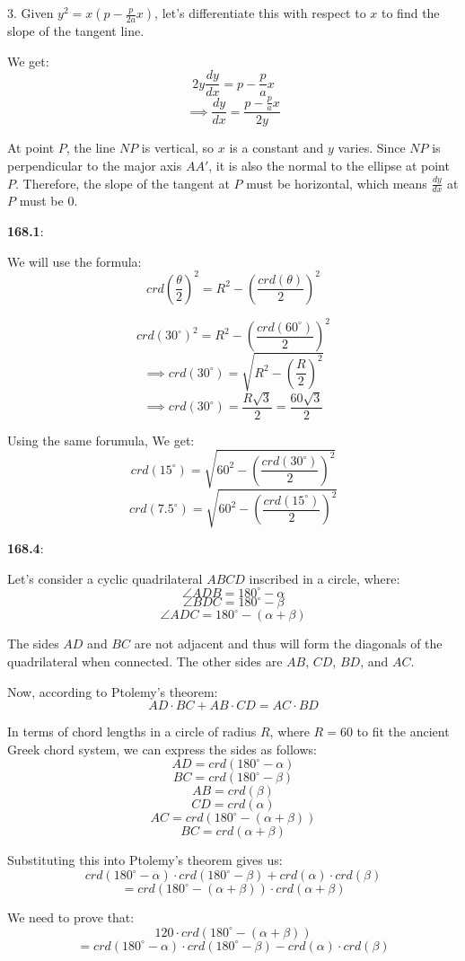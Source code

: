 \documentclass{article}
\begin{document}
3. Given $y^2 = x(p - \frac{p}{2a} x)$, let's differentiate this with respect to $x$
to find the slope of the tangent line.

We get:
\[2y \frac{dy}{dx} = p - \frac{p}{a} x\]
\[\implies \frac{dy}{dx} = \frac{p-\frac{p}{a}x}{2y}\]

At point $P$, the line $N P$ is vertical, so $x$ is a constant and $y$ varies.
Since $N P$ is perpendicular to the major axis $A A'$, it is also the normal
to the ellipse at point $P$. Therefore, the slope of the tangent at $P$
must be horizontal, which means $\frac{dy}{dx}$ at $P$ must be $0$.

\textbf{168.1}:

We will use the formula:
\[crd\left(\frac{\theta}{2}\right)^2 = R^2 - \left(\frac{crd(\theta)}{2}\right)^2\]

\[crd(30^\circ)^2 = R^2 - \left(\frac{crd(60^\circ)}{2}\right)^2\]
\[\implies crd(30^\circ) = \sqrt{R^2 - \left(\frac{R}{2}\right)^2}\]
\[\implies crd(30^\circ) = \frac{R \sqrt{3}}{2} = \frac{60 \sqrt{3}}{2}\]

Using the same forumula, 
We get:
\[crd(15^\circ) = \sqrt{60^2 - \left(\frac{crd(30^\circ)}{2}\right)^2}\]
\[crd(7.5^\circ) = \sqrt{60^2 - \left(\frac{crd(15^\circ)}{2}\right)^2}\]

\textbf{168.4}:

Let's consider a cyclic quadrilateral $ABCD$ inscribed in a circle, where:
\[\angle ADB = 180^\circ - \alpha\]
\[\angle BDC = 180^\circ - \beta\]
\[\angle ADC = 180^\circ - (\alpha + \beta)\]

The sides $AD$ and $BC$ are not adjacent and thus will form the diagonals
of the quadrilateral when connected. The other sides are $AB$, $CD$, $BD$, and $AC$.

Now, according to Ptolemy's theorem:
\[AD \cdot BC + AB \cdot CD = AC \cdot BD\]

In terms of chord lengths in a circle of radius $R$, where $R = 60$
to fit the ancient Greek chord system, we can express the sides as follows:
\[AD = crd(180^\circ - \alpha)\]
\[BC = crd(180^\circ - \beta)\]
\[AB = crd(\beta)\]
\[CD = crd(\alpha)\]
\[AC = crd(180^\circ - (\alpha + \beta))\]
\[BC = crd(\alpha + \beta)\]

Substituting this into Ptolemy's theorem gives us:
\[crd(180^\circ - \alpha) \cdot crd(180^\circ - \beta) + crd(\alpha) \cdot crd(\beta)\]
\[= crd(180^\circ - (\alpha + \beta)) \cdot crd(\alpha + \beta)\]

We need to prove that:
\[120 \cdot crd(180^\circ - (\alpha + \beta))\]
\[= crd(180^\circ - \alpha) \cdot crd(180^\circ - \beta) - crd(\alpha) \cdot crd(\beta)\]
\end{document}
